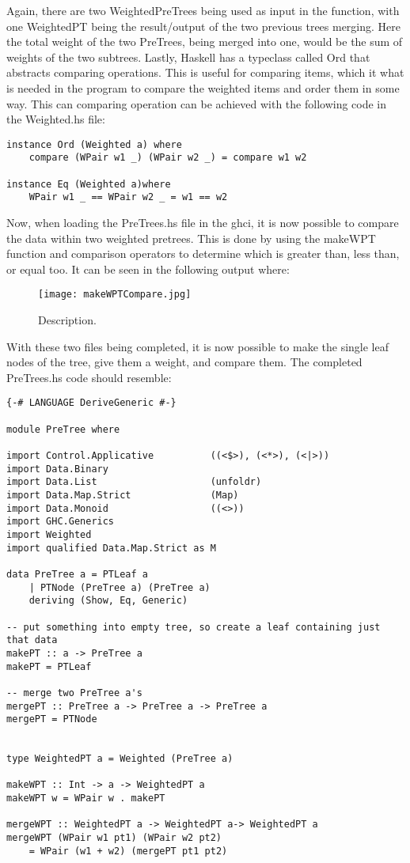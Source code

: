 \documentclass{article}
\begin{document}
Again, there are two WeightedPreTrees being used as input in the function, with one WeightedPT being the result/output of the two previous trees merging.
Here the total weight of the two PreTrees, being merged into one, would be the sum of weights of the two subtrees.
Lastly, Haskell has a typeclass called Ord that abstracts comparing operations. This is useful for comparing items, which it what is needed in the program to compare the weighted items and order them in some way.
This can comparing operation can be achieved with the following code in the Weighted.hs file:

\begin{lstlisting}
instance Ord (Weighted a) where
    compare (WPair w1 _) (WPair w2 _) = compare w1 w2

instance Eq (Weighted a)where
    WPair w1 _ == WPair w2 _ = w1 == w2
\end{lstlisting}

Now, when loading the PreTrees.hs file in the ghci, it is now possible to compare the data within two weighted pretrees. This is done by using the makeWPT function and comparison operators to determine which is greater than, less than, or equal too.
It can be seen in the following output where:
\begin{figure}[htp]
    \centering
    \texttt{[image: makeWPTCompare.jpg]}
    \caption{Description.}
    \label{fig: Haskell in Command Line}
\end{figure}
 With these two files being completed, it is now possible to make the single leaf nodes of the tree, give them a weight, and compare them.
 The completed PreTrees.hs code should resemble:
 \begin{lstlisting}
{-# LANGUAGE DeriveGeneric #-}

module PreTree where

import Control.Applicative          ((<$>), (<*>), (<|>))
import Data.Binary
import Data.List                    (unfoldr)
import Data.Map.Strict              (Map)
import Data.Monoid                  ((<>))
import GHC.Generics
import Weighted
import qualified Data.Map.Strict as M

data PreTree a = PTLeaf a
    | PTNode (PreTree a) (PreTree a)
    deriving (Show, Eq, Generic)

-- put something into empty tree, so create a leaf containing just that data
makePT :: a -> PreTree a
makePT = PTLeaf

-- merge two PreTree a's
mergePT :: PreTree a -> PreTree a -> PreTree a
mergePT = PTNode


type WeightedPT a = Weighted (PreTree a)

makeWPT :: Int -> a -> WeightedPT a
makeWPT w = WPair w . makePT

mergeWPT :: WeightedPT a -> WeightedPT a-> WeightedPT a
mergeWPT (WPair w1 pt1) (WPair w2 pt2)
    = WPair (w1 + w2) (mergePT pt1 pt2)

\end{lstlisting}
\end{document}
